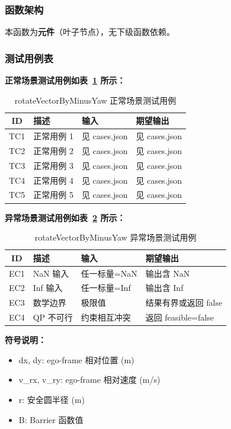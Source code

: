 \documentclass[a4paper,10pt]{article}
\begin{document}
\subsubsection{函数架构}
\par 本函数为\textbf{元件}（叶子节点），无下级函数依赖。

\subsubsection{测试用例表}
\noindent\textbf{正常场景测试用例如表~\ref{tab:normal_rotateVectorByMinusYaw} 所示：}
\begin{table}[h]
\centering
\caption{rotateVectorByMinusYaw 正常场景测试用例}
\label{tab:normal_rotateVectorByMinusYaw}
\begin{tabular}{|c|p{3.5cm}|p{3.5cm}|p{3.5cm}|}
\hline
ID & 描述 & 输入 & 期望输出 \\ \hline
  TC1 & 正常用例 1 & 见 cases.json & 见 cases.json \\ \hline
  TC2 & 正常用例 2 & 见 cases.json & 见 cases.json \\ \hline
  TC3 & 正常用例 3 & 见 cases.json & 见 cases.json \\ \hline
  TC4 & 正常用例 4 & 见 cases.json & 见 cases.json \\ \hline
  TC5 & 正常用例 5 & 见 cases.json & 见 cases.json \\ \hline
\end{tabular}
\end{table}

\noindent\textbf{异常场景测试用例如表~\ref{tab:abnormal_rotateVectorByMinusYaw} 所示：}
\begin{table}[h]
\centering
\caption{rotateVectorByMinusYaw 异常场景测试用例}
\label{tab:abnormal_rotateVectorByMinusYaw}
\begin{tabular}{|c|p{3.5cm}|p{3.5cm}|p{3.5cm}|}
\hline
ID & 描述 & 输入 & 期望输出 \\ \hline
  EC1 & NaN 输入 & 任一标量=NaN & 输出含 NaN \\ \hline
  EC2 & Inf 输入 & 任一标量=Inf & 输出含 Inf \\ \hline
  EC3 & 数学边界 & 极限值 & 结果有界或返回 false \\ \hline
  EC4 & QP 不可行 & 约束相互冲突 & 返回 feasible=false \\ \hline
\end{tabular}
\end{table}

\noindent\textbf{符号说明：}
\begin{itemize}
  \item dx, dy: ego-frame 相对位置 (m)
  \item v\_rx, v\_ry: ego-frame 相对速度 (m/s)
  \item r: 安全圆半径 (m)
  \item B: Barrier 函数值
\end{itemize}
\end{document}
